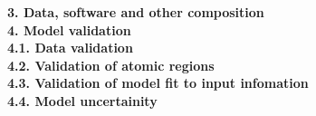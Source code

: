 \documentclass[12pt,a4paper]{article}
\begin{document}
\pagebreak







\textbf{\Large 3. Data, software and other composition}  \\


\textbf{\Large 4. Model validation}  \\

\textbf{\large 4.1. Data validation}  \\

\textbf{\large 4.2. Validation of atomic regions}  \\

\textbf{\large 4.3. Validation of model fit to input infomation}  \\

\textbf{\large 4.4. Model uncertainity}  \\


\pagebreak

  
\end{document}
